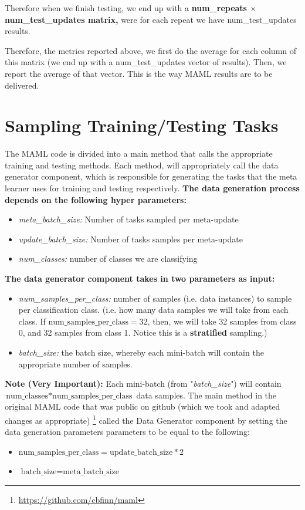 \documentclass{article}
\begin{document}
\noindent Therefore when we finish testing, we end up with a \textbf{num\_repeats $\times$ num\_test\_updates matrix,} were for each repeat we have num\_test\_updates results.

\noindent Therefore, the metrics reported above, we first do the average for each column of this matrix (we end up with a  num\_test\_updates vector of results). Then, we report the average of that vector. This is the way MAML results are to be delivered.

\section{Sampling Training/Testing Tasks}
The MAML code is divided into a main method that calls the appropriate training and testing methods. Each method, will appropriately call the data generator component, which is responsible for generating the tasks that the meta learner uses for training and testing respectively. \textbf{The data generation process depends on the following hyper parameters:}
\begin{itemize}
\item \textit{meta\_batch\_size:} Number of tasks sampled per meta-update
\item \textit{update\_batch\_size:} Number of tasks samples per meta-update
\item \textit{num\_classes:} number of classes we are classifying
\end{itemize}

\noindent\textbf{The data generator component takes in two parameters as input:}
\begin{itemize}
\item \textit{num\_samples\_per\_class:} number of samples (i.e. data instances) to sample per classification class. (i.e. how many data samples we will take from each class. If $\text{num\_samples\_per\_class}= 32$, then, we will take 32 samples from class 0, and 32 samples from class 1. Notice this is a \textbf{stratified} sampling.)
\item \textit{batch\_size:} the batch size, whereby each mini-batch will contain the appropriate number of samples. 
\end{itemize}

\noindent\textbf{Note (Very Important):} Each mini-batch (from "\textit{batch\_size}") will contain  $  \text{num\_classes} * \text{num\_samples\_per\_class}$ data samples. The main method in the original MAML code that was public on github (which we took and adapted changes as appropriate) \footnote{\url{https://github.com/cbfinn/maml}} called the Data Generator component by setting the data generation parameters parameters to be equal to the following:
\begin{itemize}
\item $\text{num\_samples\_per\_class} = \text{update\_batch\_size} * 2$
\item $\text{batch\_size} = \text{meta\_batch\_size}$
\end{itemize}
\end{document}
